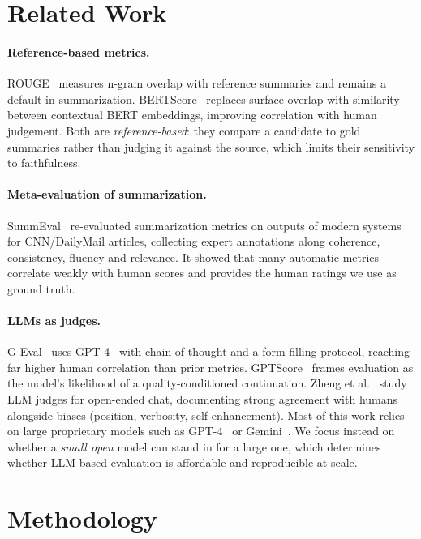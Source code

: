 \documentclass[runningheads]{llncs}
\begin{document}
\section{Related Work}

\paragraph{Reference-based metrics.} ROUGE~\cite{lin2004rouge} measures n-gram
overlap with reference summaries and remains a default in summarization.
BERTScore~\cite{zhang2020bertscore} replaces surface overlap with similarity between
contextual BERT embeddings, improving correlation with human judgement. Both are
\emph{reference-based}: they compare a candidate to gold summaries rather than
judging it against the source, which limits their sensitivity to faithfulness.

\paragraph{Meta-evaluation of summarization.} SummEval~\cite{fabbri2021summeval}
re-evaluated summarization metrics on outputs of modern systems for CNN/DailyMail
articles, collecting expert annotations along coherence, consistency, fluency and
relevance. It showed that many automatic metrics correlate weakly with human scores
and provides the human ratings we use as ground truth.

\paragraph{LLMs as judges.} G-Eval~\cite{liu2023geval} uses GPT-4~\cite{openai2023gpt4}
with chain-of-thought and a form-filling protocol, reaching far higher human
correlation than prior metrics. GPTScore~\cite{fu2023gptscore} frames evaluation as
the model's likelihood of a quality-conditioned continuation. Zheng et
al.~\cite{zheng2023judging} study LLM judges for open-ended chat, documenting strong
agreement with humans alongside biases (position, verbosity, self-enhancement).
Most of this work relies on large proprietary models such as
GPT-4~\cite{openai2023gpt4} or Gemini~\cite{gemini2024}. We focus instead on whether
a \emph{small open} model can stand in for a large one, which determines whether
LLM-based evaluation is affordable and reproducible at scale.

\section{Methodology}
\end{document}
